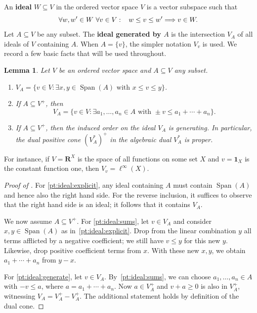 \documentclass[11pt]{amsart}
\numberwithin{equation}{section}
\newtheorem{lem}[thm]{Lemma}
\theoremstyle{definition}
\theoremstyle{definition}
\newcommand*{\RR}{\mathbf{R}}
\newcommand*{\se}{\subseteq}
\newcommand*{\one}{\boldsymbol{1}}
\DeclareMathOperator{\Span}{Span}
\begin{document}
\medskip
An \textbf{ideal} $W\se V$ in the ordered vector space $V$ is a vector subspace such that
\begin{equation*}
\forall w, w'\in W\ \forall v\in V:\kern3mm w\leq v\leq w' \Longrightarrow v\in W.
\end{equation*}
Let $A\se V$ be any subset. The \textbf{ideal generated by $A$} is the intersection $V_A$ of all ideals of $V$ containing $A$. When $A=\{v\}$, the simpler notation $V_v$ is used. We record a few basic facts that will be used throughout.

\begin{lem}\label{lem:ideal}
Let $V$ be an ordered vector space and $A\se V$ any subset.
\begin{enumerate}[label=\normalfont(\roman*)]
\item $\displaystyle V_A = \big\{ v\in V : \exists x,y\in\Span(A) \text{ with } x\leq v \leq y \big\}$.\label{pt:ideal:explicit}
%
\item If $A\se V^+$, then\label{pt:ideal:sums}
\begin{equation*}
V_A = \big\{ v\in V : \exists a_1, \ldots, a_n\in A \text{ with } \pm v \leq a_1 + \cdots + a_n \big\}.
\end{equation*}
%
\item If $A\se V^+$, then the induced order on the ideal $V_A$ is generating. In particular, the dual positive cone $(V_A^*)^+$ in the algebraic dual $V_A^*$ is proper. \label{pt:ideal:generate}
\end{enumerate}
\end{lem}

For instance, if $V=\RR^X$ is the space of all functions on some set $X$ and $v=\one_X$ is the constant function one, then $V_v=\ell^\infty(X)$.

\begin{proof}[Proof of ]
For \ref{pt:ideal:explicit}, any ideal containing $A$ must contain $\Span(A)$ and hence also the right hand side. For the reverse inclusion, it suffices to observe that the right hand side is an ideal; it follows that it contains $V_A$.

We now assume $A\se V^+$. For \ref{pt:ideal:sums}, let $v\in V_A$ and consider $x,y\in\Span(A)$ as in~\ref{pt:ideal:explicit}. Drop from the linear combination $y$ all terms afflicted by a negative coefficient; we still have $v\leq y$ for this new $y$. Likewise, drop positive coefficient terms from $x$. With these new $x,y$, we obtain $a_1 + \cdots + a_n$ from $y-x$.

For \ref{pt:ideal:generate}, let $v\in V_A$. By~\ref{pt:ideal:sums}, we can choose $a_1, \ldots, a_n\in A$ with $- v \leq a$, where $a=a_1 + \cdots + a_n$. Now $a\in V_A^+$ and $v+a\geq 0$ is also in $V_A^+$, witnessing $V_A = V_A^+ - V_A^+$. The additional statement holds by definition of the dual cone.
\end{proof}
\end{document}
